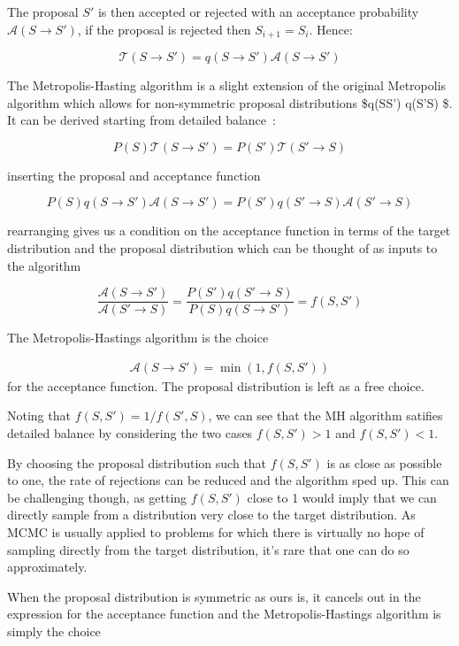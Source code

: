 The proposal \(S'\) is then accepted or rejected with an acceptance probability \(\mathcal{A}(S \to S')\), if the proposal is rejected then \(S_{i+1} = S_{i}\). Hence:

\[\mathcal{T}(S\to S') = q(S\to S')\mathcal{A}(S \to S')\]

The Metropolis-Hasting algorithm is a slight extension of the original Metropolis algorithm which allows for non-symmetric proposal distributions \$q(S\to S') \neq q(S'\to S) \$. It can be derived starting from detailed balance~\autocite{krauthIntroductionMonteCarlo1998}:

\[
P(S)\mathcal{T}(S \to S') = P(S')\mathcal{T}(S' \to S)
\]

inserting the proposal and acceptance function

\[
P(S)q(S \to S')\mathcal{A}(S \to S') = P(S')q(S' \to S)\mathcal{A}(S' \to S)
\]

rearranging gives us a condition on the acceptance function in terms of the target distribution and the proposal distribution which can be thought of as inputs to the algorithm

\[
\frac{\mathcal{A}(S \to S')}{\mathcal{A}(S' \to S)} = \frac{P(S')q(S' \to S)}{P(S)q(S \to S')} = f(S, S')
\]

The Metropolis-Hastings algorithm is the choice

\[
\begin{aligned}
\label{eq:mh} 
\mathcal{A}(S \to S') = \min\left(1, f(S,S')\right)
\end{aligned}
\] for the acceptance function. The proposal distribution is left as a free choice.

Noting that \(f(S,S') = 1/f(S',S)\), we can see that the MH algorithm satifies detailed balance by considering the two cases \(f(S,S') > 1\) and \(f(S,S') < 1\).

By choosing the proposal distribution such that \(f(S,S')\) is as close as possible to one, the rate of rejections can be reduced and the algorithm sped up. This can be challenging though, as getting \(f(S,S')\) close to 1 would imply that we can directly sample from a distribution very close to the target distribution. As MCMC is usually applied to problems for which there is virtually no hope of sampling directly from the target distribution, it's rare that one can do so approximately.

When the proposal distribution is symmetric as ours is, it cancels out in the expression for the acceptance function and the Metropolis-Hastings algorithm is simply the choice

